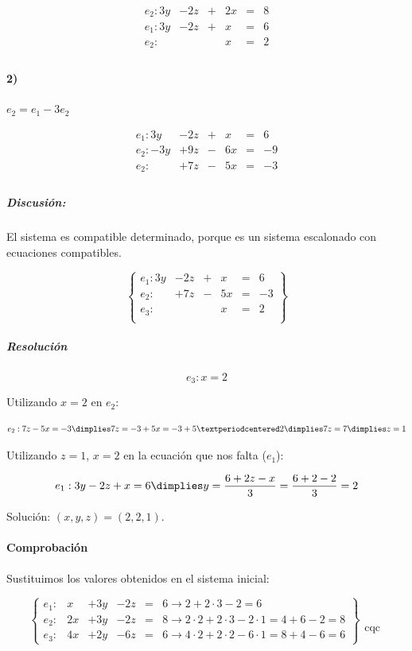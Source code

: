 \documentclass[palatino,nosec,nochap]{Docencia}
\begin{document}
\begin{problem}
\[
\begin{array}{rccccc}
e_2: 3y&-2z&+&2x&=&8\\
e_1: 3y&-2z&+&x&=&6\\
\hline
e_2: &&&x&=&2\\
\end{array}
\]	


\paragraph{2)} $e_2 = e_1-3e_2$

\[
\begin{array}{rccccc}
e_1: 3y&-2z&+&x&=&6\\
e_2: -3y&+9z&-&6x&=&-9\\
\hline
e_2: &+7z&-&5x&=&-3\\
\end{array}
\]	



\subparagraph{Discusión:} El sistema es compatible determinado, porque es un sistema escalonado con ecuaciones compatibles.

\[
\left\{\begin{array}{lccccc}
e_1: 3y&-2z&+&x&=&6\\
e_2: &+7z&-&5x&=&-3\\
e_3: &&&x&=&2\\
\end{array}\right\}
\]


\subparagraph{Resolución} 

\[e_3: x=2\]

Utilizando $x=2$ en $e_2$:

\[e_2: 7z-5x = -3 \dimplies 7z = -3+5x = -3+5·2 \dimplies 7z=7 \dimplies z=1\]

Utilizando $z=1$, $x=2$ en la ecuación que nos falta ($e_1$):

\[
e_1: 3y-2z+x=6 \dimplies y=\frac{6+2z-x}{3} = \frac{6+2-2}{3} = 2
\]


Solución: $(x,y,z) = (2,2,1)$.

\paragraph{Comprobación}

Sustituimos los valores obtenidos en el sistema inicial:


\[
\left\{\begin{array}{lccccl}
e_1: &x&+3y&-2z&=&6 \to 2+2·3-2 = 6\\
e_2: &2x&+3y&-2z&=&8 \to 2·2 + 2·3-2·1 = 4+6-2 = 8\\
e_3: &4x&+2y&-6z&=&6 \to 4·2+2·2-6·1 = 8+4-6 = 6  
\end{array}\right\} \begin{array}{c}\\\\\\\\\text{cqc}\end{array}
\]
\end{problem}
\end{document}
